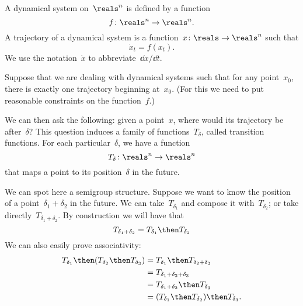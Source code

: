 \begin{example}
\label{exa:transition-functions}
  \begin{definition}
    A dynamical system on~$\reals^n$ is defined by a function
    \begin{equation}
      f\colon \reals^n \to \reals^n.
    \end{equation}
    A trajectory of a dynamical system is a function~$x\colon \reals \to \reals^n$ such that
    \begin{equation}
      \dot{x}_t = f(x_t).
    \end{equation}
    We use the notation~$\dot{x}$ to abbreviate~$\dd x / \dd t$.
  \end{definition}

  Suppose that we are dealing with dynamical systems such that for any point~$x_0$, there
  is exactly one trajectory beginning at~$x_0$. (For this we need to put reasonable constraints
  on the function~$f$.)

  We can then ask the following: given a point~$x$, where would its trajectory be after~$\delta$?
  This question induces a family of functions~$T_\delta$, called transition functions.
  For each particular~$\delta$, we have a function
  \begin{equation*}
    T_{\delta}\colon \reals^n \to  \reals^n
  \end{equation*}
  that maps a point to its position~$\delta$ in the future.

  We can spot here a semigroup structure. Suppose we want to know the position of a point~$\delta_1 + \delta_2$
  in the future. We can take~$T_{\delta_1}$ and compose it with~$T_{\delta_2}$; or take directly~$T_{\delta_1 + \delta_2}$.
  By construction we will have that
  \begin{equation}
    \label{eq:transition-property}
    T_{\delta_1 + \delta_2} = T_{\delta_1} \then T_{\delta_2}
  \end{equation}
  We can also easily prove associativity:
  \begin{equation}
  \begin{aligned}
    T_{\delta_1}\then (T_{\delta_2}\then T_{\delta_3})&=T_{\delta_1}\then T_{\delta_2+\delta_3}\\
    &=T_{\delta_1+\delta_2+\delta_3}\\
    &=T_{\delta_1+\delta_2}\then T_{\delta_3}\\
    &=(T_{\delta_1}\then T_{\delta_2})\then T_{\delta_3}.
\end{aligned}
\end{equation}


\end{example}
